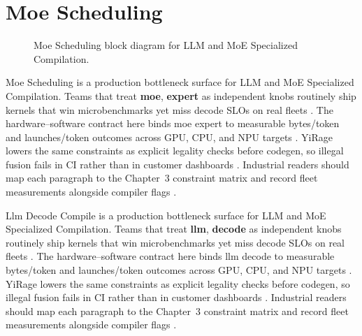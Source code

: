 \section{Moe Scheduling}
\label{sec:moe_scheduling}
\begin{figure}[t]
\centering
{}
\caption{Moe Scheduling block diagram for LLM and MoE Specialized Compilation.}
\label{fig:moe_scheduling_architecture}
\end{figure}


Moe Scheduling is a production bottleneck surface for LLM and MoE Specialized Compilation. Teams that treat \textbf{moe}, \textbf{expert} as independent knobs routinely ship kernels that win microbenchmarks yet miss decode SLOs on real fleets \citep{taxbreak2026,semianalysis2024tma}. The hardware--software contract here binds moe expert to measurable bytes/token and launches/token outcomes across GPU, CPU, and NPU targets \citep{memoryfloor2026,amd2024xdna}. YiRage lowers the same constraints as explicit legality checks before codegen, so illegal fusion fails in CI rather than in customer dashboards \citep{nvidia2022hopper,amd2024aie}. Industrial readers should map each paragraph to the Chapter~3 constraint matrix and record fleet measurements alongside compiler flags \citep{semianalysis2024tma,dlbook}.

Llm Decode Compile is a production bottleneck surface for LLM and MoE Specialized Compilation. Teams that treat \textbf{llm}, \textbf{decode} as independent knobs routinely ship kernels that win microbenchmarks yet miss decode SLOs on real fleets \citep{liu2024deepseekv3,memoryfloor2026}. The hardware--software contract here binds llm decode to measurable bytes/token and launches/token outcomes across GPU, CPU, and NPU targets \citep{patel2025llminference,nvidia2022hopper}. YiRage lowers the same constraints as explicit legality checks before codegen, so illegal fusion fails in CI rather than in customer dashboards \citep{taxbreak2026,semianalysis2024tma}. Industrial readers should map each paragraph to the Chapter~3 constraint matrix and record fleet measurements alongside compiler flags \citep{memoryfloor2026,amd2024xdna}.

